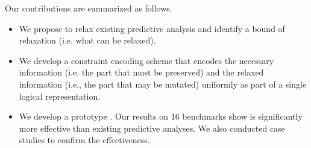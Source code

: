 Our contributions are summarized as follows.
\begin{itemize}
\item We propose to relax existing predictive analysis and identify a bound of relaxation (i.e. what can
be relaxed).
\item We develop a constraint encoding scheme that encodes the necessary information (i.e. the
part that must be preserved) and the relaxed information (i.e., the part that may be mutated) uniformly as part of a single logical representation.
\item We develop a prototype \sysname. Our results on 16 benchmarks show \sysname is significantly more effective than existing predictive analyses. We also conducted case studies to confirm the effectiveness.
\end{itemize}








